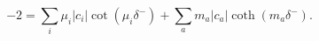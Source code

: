 \begin{equation} 
\label{delta--}
- 2 =
\sum_i \mu_i |c_i| \cot(\mu_i  \delta^-) + 
\sum_a m_a |c_a| \coth(m_a  \delta^-).
\end{equation}

